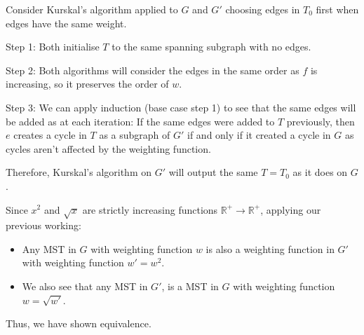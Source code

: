 \documentclass[a4paper, 11pt]{article}
\newcommand{\RR}{\mathbb{R}}
\def\set#1{\left\{ #1 \right\}}
\begin{document}
\begin{multicols*}{2}
\begin{enumerate}[label=(\alph*)]
		      Consider Kurskal's algorithm applied to $G$ and $G'$ choosing edges in $T_0$ first when edges have the same weight.
		      \begin{mdframed}
			      Step 1: Both initialise $T$ to the same spanning subgraph with no edges.

			      Step 2: Both algorithms will consider the edges in the same order as $f$ is increasing, so it preserves the order of $w$.

			      Step 3: We can apply induction (base case step 1) to see that the same edges will be added as at each iteration: If the same edges were added to $T$ previously, then $e$ creates a cycle in $T$ as a subgraph of $G'$ if and only if it created a cycle in $G$ as cycles aren't affected by the weighting function.

			      Therefore, Kurskal's algorithm on $G'$ will output the same $T=T_0$ as it does on $G$.
		      \end{mdframed}

		      Since $x^2$ and $\sqrt{x}$ are strictly increasing functions  $\RR^+\to\RR^+$, applying our previous working:

		      \begin{itemize}
			      \item
			            Any MST in $G$ with weighting function $w$ is also a weighting function in $G'$ with weighting function $w'=w^2$.

			      \item
			            We also see that any MST in $G'$, is a MST in $G$ with weighting function $w=\sqrt{w'}$.
		      \end{itemize}

		      Thus, we have shown equivalence.











\end{enumerate}
\end{multicols*}
\end{document}

